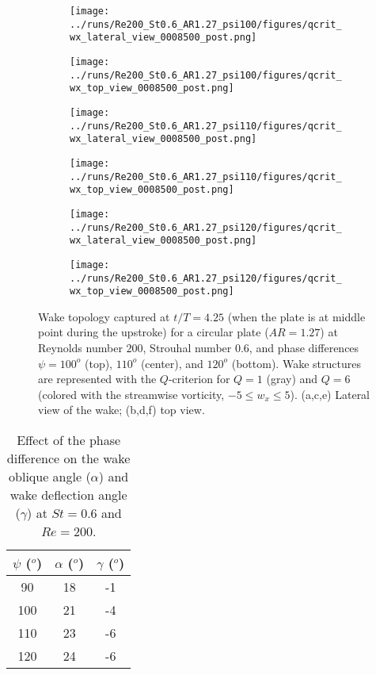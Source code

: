 \begin{figure}
  \centering
  \begin{subfigure}[]{0.45\textwidth}
    \centering
    \texttt{[image: ../runs/Re200\_St0.6\_AR1.27\_psi100/figures/qcrit\_wx\_lateral\_view\_0008500\_post.png]}
    \caption{}
  \end{subfigure}
  \hfill
  \begin{subfigure}[]{0.45\textwidth}
    \centering
    \texttt{[image: ../runs/Re200\_St0.6\_AR1.27\_psi100/figures/qcrit\_wx\_top\_view\_0008500\_post.png]}
    \caption{}
  \end{subfigure}
  \vspace{1cm}
  \begin{subfigure}[]{0.45\textwidth}
    \centering
    \texttt{[image: ../runs/Re200\_St0.6\_AR1.27\_psi110/figures/qcrit\_wx\_lateral\_view\_0008500\_post.png]}
    \caption{}
  \end{subfigure}
  \hfill
  \begin{subfigure}[]{0.45\textwidth}
    \centering
    \texttt{[image: ../runs/Re200\_St0.6\_AR1.27\_psi110/figures/qcrit\_wx\_top\_view\_0008500\_post.png]}
    \caption{}
  \end{subfigure}
  \vspace{1cm}
  \begin{subfigure}[]{0.45\textwidth}
    \centering
    \texttt{[image: ../runs/Re200\_St0.6\_AR1.27\_psi120/figures/qcrit\_wx\_lateral\_view\_0008500\_post.png]}
    \caption{}
  \end{subfigure}
  \hfill
  \begin{subfigure}[]{0.45\textwidth}
    \centering
    \texttt{[image: ../runs/Re200\_St0.6\_AR1.27\_psi120/figures/qcrit\_wx\_top\_view\_0008500\_post.png]}
    \caption{}
  \end{subfigure}
  \caption{Wake topology captured at $t / T = 4.25$ (when the plate is at middle point during the upstroke) for a circular plate ($AR = 1.27$) at Reynolds number $200$, Strouhal number $0.6$, and phase differences $\psi = 100^o$ (top), $110^o$ (center), and $120^o$ (bottom). Wake structures are represented with the $Q$-criterion for $Q = 1$ (gray) and $Q = 6$ (colored with the streamwise vorticity, $-5 \leq w_x \leq 5$). (a,c,e) Lateral view of the wake; (b,d,f) top view.}
  \label{fig:phase_wake_topology}
\end{figure}

\begin{table}
  \centering
  \begin{tabular}{ccc}
    \hline\hline
    $\psi$ ($^o$) & $\alpha$ ($^o$) & $\gamma$ ($^o$) \\
    \hline
    90 & 18 & -1 \\
    100 & 21 & -4 \\
    110 & 23 & -6 \\
    120 & 24 & -6 \\
    \hline\hline
  \end{tabular}
  \caption{Effect of the phase difference on the wake oblique angle ($\alpha$) and wake deflection angle ($\gamma$) at $St = 0.6$ and $Re = 200$.}
  \label{tab:phase_angles}
\end{table}

